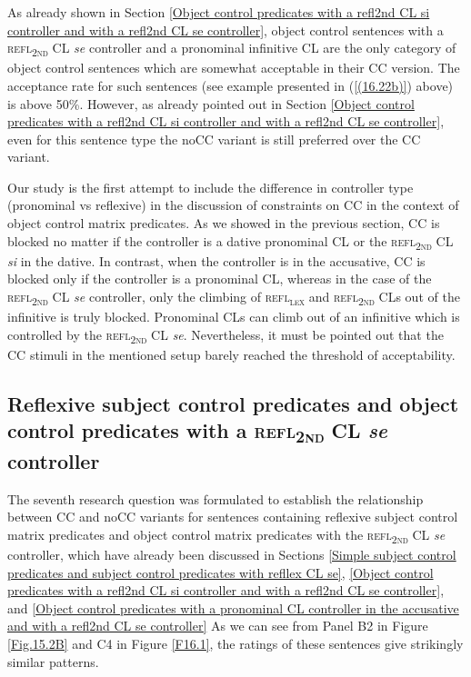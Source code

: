 \largerpage[2]%
\noindent As already shown in Section \ref{Object control predicates with a refl2nd CL si controller and with a refl2nd CL se controller}, object control sentences with a \textsc{refl\textsubscript{2nd}} CL \textit{se} controller and a pronominal infinitive CL are the only category of object control sentences which are somewhat acceptable in their CC version. The acceptance rate for such sentences (see example presented in (\ref{(16.22b)}) above) is above 50\%. However, as already pointed out in Section \ref{Object control predicates with a refl2nd CL si controller and with a refl2nd CL se controller}, even for this sentence type the noCC variant is still preferred over the CC variant.

Our study is the first attempt to include the difference in controller type (pro\-no\-mi\-nal vs reflexive) in the discussion of constraints on CC in the context of object control matrix predicates. As we showed in the previous section, CC is blocked no matter if the controller is a dative pronominal CL or the \textsc{refl\textsubscript{2nd}} CL \textit{si} in the dative. In contrast, when the controller is in the accusative, CC is blocked only if the controller is a pronominal CL, whereas in the case of the \textsc{refl\textsubscript{2nd}} CL \textit{se} controller, only the climbing of \textsc{refl\textsubscript{\textsc{lex}}} and \textsc{refl\textsubscript{2nd}} CLs out of the infinitive is truly blocked. Pronominal CLs can climb out of an infinitive which is controlled by the \textsc{refl\textsubscript{2nd}} CL \textit{se}. Nevertheless, it must be pointed out that the CC stimuli in the mentioned setup barely reached the threshold of acceptability. 

\subsection{Reflexive subject control predicates and object control predicates with a \textsc{refl\textsubscript{2nd}} CL \textit{se} controller}
\label{Reflexive subject control predicates and object control predicates with a refl2md CL se controller}

\largerpage[2]

The seventh research question was formulated to establish the relationship between CC and noCC variants for sentences containing reflexive subject control matrix predicates and object control matrix predicates with the \textsc{refl\textsubscript{2nd}} CL \textit{se} controller, which have already been discussed in Sections \ref{Simple subject control predicates and subject control predicates with refllex CL se}, \ref{Object control predicates with a refl2nd CL si controller and with a refl2nd CL se controller}, and \ref{Object control predicates with a pronominal CL controller in the accusative and with a refl2nd CL se controller} As we can see from Panel B2 in Figure \ref{Fig.15.2B} and C4 in Figure \ref{F16.1}, the ratings of these sentences give strikingly similar patterns. 


